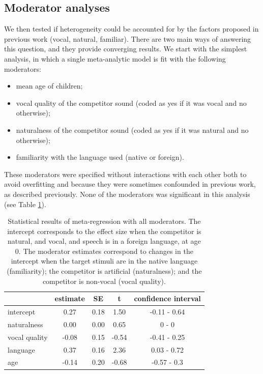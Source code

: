 \documentclass[
  man,mask,floatsintext]{apa6}
\providecommand{\tightlist}{%
  \setlength{\itemsep}{0pt}\setlength{\parskip}{0pt}}
\begin{document}
\hypertarget{moderator-analyses}{%
\subsection{Moderator analyses}\label{moderator-analyses}}

We then tested if heterogeneity could be accounted for by the factors proposed in previous work (vocal, natural, familiar). There are two main ways of answering this question, and they provide converging results. We start with the simplest analysis, in which a single meta-analytic model is fit with the following moderators:

\begin{itemize}
\tightlist
\item
  mean age of children;
\item
  vocal quality of the competitor sound (coded as yes if it was vocal and no otherwise);
\item
  naturalness of the competitor sound (coded as yes if it was natural and no otherwise);
\item
  familiarity with the language used (native or foreign).
\end{itemize}

These moderators were specified without interactions with each other both to avoid overfitting and because they were sometimes confounded in previous work, as described previously. None of the moderators was significant in this analysis (see Table \ref{tab:Table2}).

\begin{table}[tbp]

\begin{center}
\begin{threeparttable}

\caption{\label{tab:Table2}Statistical results of meta-regression with all moderators. The intercept corresponds to the effect size when the competitor is natural, and vocal, and speech is in a foreign language, at age 0. The moderator estimates correspond to changes in the intercept when the target stimuli are in the native language (familiarity); the competitor is artificial (naturalness); and the competitor is non-vocal (vocal quality).}

\begin{tabular}{lcccc}
\toprule
 & estimate & SE & t & confidence interval\\
\midrule
intercept & 0.27 & 0.18 & 1.50 & -0.11 - 0.64\\
naturalness & 0.00 & 0.00 & 0.65 & 0 - 0\\
vocal quality & -0.08 & 0.15 & -0.54 & -0.41 - 0.25\\
language & 0.37 & 0.16 & 2.36 & 0.03 - 0.72\\
age & -0.14 & 0.20 & -0.68 & -0.57 - 0.3\\
\bottomrule
\end{tabular}

\end{threeparttable}
\end{center}

\end{table}
\end{document}
